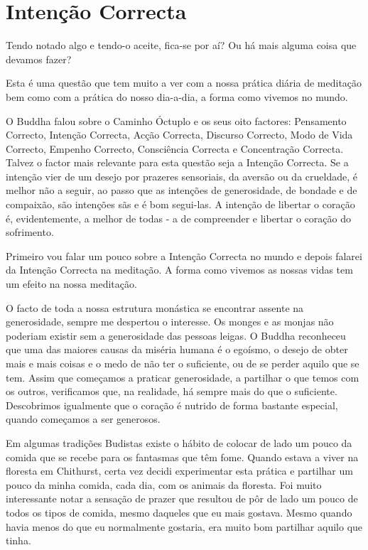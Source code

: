 \chapter{Intenção Correcta}

 Tendo notado algo e tendo-o aceite, fica-se por aí?
Ou há mais alguma coisa que devamos fazer?

 Esta é uma questão que tem muito a ver com a nossa
prática diária de meditação bem como com a prática do nosso dia-a-dia, a
forma como vivemos no mundo.

O Buddha falou sobre o Caminho Óctuplo e os seus oito factores:
Pensamento Correcto, Intenção Correcta, Acção Correcta, Discurso
Correcto, Modo de Vida Correcto, Empenho Correcto, Consciência Correcta
e Concentração Correcta. Talvez o factor mais relevante para esta
questão seja a Intenção Correcta. Se a intenção vier de um desejo por
prazeres sensoriais, da aversão ou da crueldade, é melhor não a seguir,
ao passo que as intenções de generosidade, de bondade e de compaixão,
são intenções sãs e é bom segui-las. A intenção de libertar o coração é,
evidentemente, a melhor de todas - a de compreender e libertar o coração
do sofrimento.

Primeiro vou falar um pouco sobre a Intenção Correcta no mundo e depois
falarei da Intenção Correcta na meditação. A forma como vivemos as
nossas vidas tem um efeito na nossa meditação.

O facto de toda a nossa estrutura monástica se encontrar assente na
generosidade, sempre me despertou o interesse. Os monges e as monjas não
poderiam existir sem a generosidade das pessoas leigas. O Buddha
reconheceu que uma das maiores causas da miséria humana é o egoísmo, o
desejo de obter mais e mais coisas e o medo de não ter o suficiente, ou
de se perder aquilo que se tem. Assim que começamos a praticar
generosidade, a partilhar o que temos com os outros, verificamos que, na
realidade, há sempre mais do que o suficiente. Descobrimos igualmente
que o coração é nutrido de forma bastante especial, quando começamos a
ser generosos.

Em algumas tradições Budistas existe o hábito de colocar de lado um
pouco da comida que se recebe para os fantasmas que têm fome. Quando
estava a viver na floresta em Chithurst, certa vez decidi experimentar
esta prática e partilhar um pouco da minha comida, cada dia, com os
animais da floresta. Foi muito interessante notar a sensação de prazer
que resultou de pôr de lado um pouco de todos os tipos de comida, mesmo
daqueles que eu mais gostava. Mesmo quando havia menos do que eu
normalmente gostaria, era muito bom partilhar aquilo que tinha.

